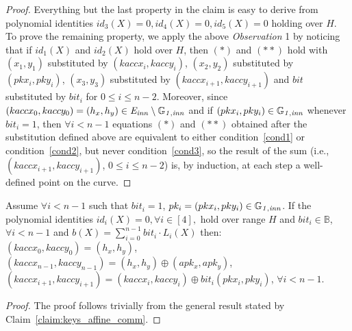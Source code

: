 \begin{proof} Everything but the last property in the claim is easy to derive from polynomial identities 
$id_3(X) =0, id_4(X )= 0, id_5(X) = 0$ holding over $H$. To prove the remaining property, we apply 
the above \textit{Observation} 1 by noticing that if $id_1(X)$ and $id_2(X)$ hold over $H$, 
then $(\ast)$ and $(\ast \ast)$ hold with $(x_1, y_1)$ substituted by $(kaccx_i,kaccy_i)$, $(x_2, y_2)$ 
substituted by $(pkx_i, pky_i)$, $(x_3, y_3)$ substituted by $(kaccx_{i+1},kaccy_{i+1})$ and 
$\mathit{bit}$ substituted by $\mathit{bit}_i$ for $0 \leq i \leq n-2$. %
Moreover, since $(kaccx_{0}, kaccy_{0}) = (h_x, h_y) \in \mathit{E}_{\mathit{inn}} \setminus \mathbb{G}_{\mathit{1,inn}}$ 
and if $(pkx_i, pky_i) \in \mathbb{G}_{\mathit{1,inn}}$ whenever $\mathit{bit}_i = 1$, then $\forall i < n-1$ 
equations $(\ast)$ and $(\ast \ast)$ obtained after the substitution defined above are equivalent to either 
condition~\ref{cond1} or condition~\ref{cond2}, but never condition~\ref{cond3}, so the result of the sum (i.e., $(kaccx_{i+1}, kaccy_{i+1})$, $0\leq i \leq n-2$) is, 
by induction, at each step a well-defined point on the curve.%
\end{proof}
\vspace{-0.1in}

\begin{corollary} Assume $\forall i < n-1$ 
such that $\mathit{bit}_i = 1$, $pk_i = (pkx_i, pky_i) \in \mathbb{G}_{\mathit{1,inn}}$. 
If the polynomial identities $id_i(X) = 0, \forall i \in [4],$ hold over range $H$ and 
$\mathit{bit_i} \in \mathbb{B}$, $\forall i < n-1$ and $b(X) = \sum_{i=0}^{n-1} \mathit{bit_i} \cdot L_i(X)$
then:  \\
$(kaccx_{0}, kaccy_{0}) = (h_x, h_y)$, \\
$(kaccx_{n-1}, kaccy_{n-1}) = (h_x, h_y) \oplus (apk_x, apk_y)$, \\
$(kaccx_{i+1}, kaccy_{i+1}) =  (kaccx_{i}, kaccy_{i}) \oplus \mathit{bit_i}(pkx_{i}, pky_{i})$, $\forall i < n-1$.
\label{corollary:keys_affine_comm}
\end{corollary}
\vspace{-0.2in}

\begin{proof}The proof follows trivially from the general result stated by Claim~\ref{claim:keys_affine_comm}. 
\end{proof}
\vspace{-0.1in}
